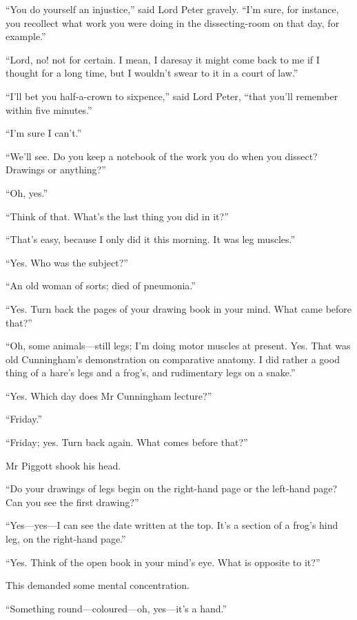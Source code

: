 \enquote{You do yourself an injustice,} said Lord Peter gravely. \enquote{I’m sure, for instance, you recollect what work you were doing in the dissecting-room on that day, for example.}

\enquote{Lord, no! not for certain. I mean, I daresay it might come back to me if I thought for a long time, but I wouldn’t swear to it in a court of law.}

\enquote{I’ll bet you half-a-crown to sixpence,} said Lord Peter, \enquote{that you’ll remember within five minutes.}

\enquote{I’m sure I can’t.}

\enquote{We’ll see. Do you keep a notebook of the work you do when you dissect? Drawings or anything?}

\enquote{Oh, yes.}

\enquote{Think of that. What’s the last thing you did in it?}

\enquote{That’s easy, because I only did it this morning. It was leg muscles.}

\enquote{Yes. Who was the subject?}

\enquote{An old woman of sorts; died of pneumonia.}

\enquote{Yes. Turn back the pages of your drawing book in your mind. What came before that?}

\enquote{Oh, some animals\allowbreak---\allowbreak still legs; I’m doing motor muscles at present. Yes. That was old Cunningham’s demonstration on comparative anatomy. I did rather a good thing of a hare’s legs and a frog’s, and rudimentary legs on a snake.}

\enquote{Yes. Which day does Mr Cunningham lecture?}

\enquote{Friday.}

\enquote{Friday; yes. Turn back again. What comes before that?}

Mr Piggott shook his head.

\enquote{Do your drawings of legs begin on the right-hand page or the left-hand page? Can you see the first drawing?}

\enquote{Yes\allowbreak---\allowbreak yes---I can see the date written at the top. It’s a section of a frog’s hind leg, on the right-hand page.}

\enquote{Yes. Think of the open book in your mind’s eye. What is opposite to it?}

This demanded some mental concentration.

\enquote{Something round\allowbreak---\allowbreak coloured---oh, yes\allowbreak---\allowbreak it’s a hand.}

